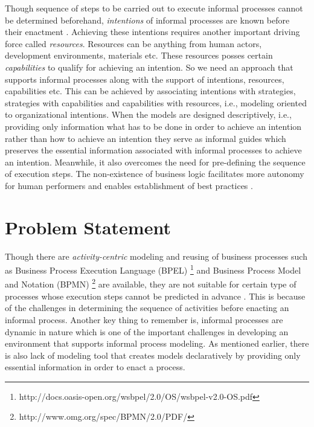 Though sequence of steps to be carried out to execute informal processes cannot be determined beforehand, \textit{intentions} of informal processes are known before their enactment \cite{Sungur2015}. Achieving these intentions requires another important driving force called \textit{resources}. Resources can be anything from human actors, development environments, materials etc. These resources posses certain \textit{capabilities} to qualify for achieving an intention. So we need an approach that supports informal processes along with the support of intentions, resources, capabilities etc. This can be achieved by associating intentions with strategies, strategies with capabilities and capabilities with resources, i.e., modeling oriented to organizational intentions. When the models are designed descriptively, i.e., providing only information what has to be done in order to achieve an intention rather than how to achieve an intention they serve as informal guides which preserves the essential information associated with informal processes to achieve an intention. Meanwhile, it also overcomes the need for pre-defining the sequence of execution steps. The non-existence of business logic facilitates more autonomy for human performers and enables establishment of best practices \cite{Sungur2014a}.

\section{Problem Statement}
\label{sec:problemstatement}
Though there are \textit{activity-centric} modeling and reusing of business processes such as Business Process Execution Language (BPEL) \footnote{http://docs.oasis-open.org/wsbpel/2.0/OS/wsbpel-v2.0-OS.pdf} and Business Process Model and Notation (BPMN) \footnote{http://www.omg.org/spec/BPMN/2.0/PDF/} are available, they are not suitable for certain type of processes whose execution steps cannot be predicted in advance \cite{Sungur2014a}. This is because of the challenges in determining the sequence of activities before enacting an informal process. Another key thing to remember is, informal processes are dynamic in nature which is one of the important challenges in developing an environment that supports informal process modeling. As mentioned earlier, there is also lack of modeling tool that creates models declaratively by providing only essential information in order to enact a process. 

